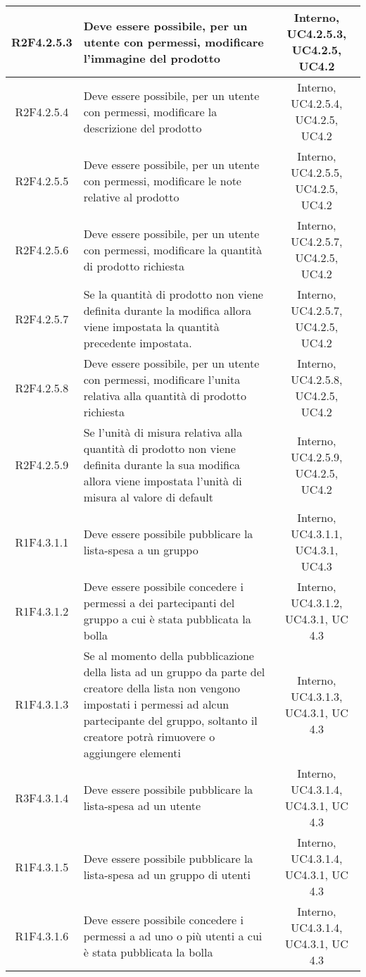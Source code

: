 \begin{longtable}{|c|>{\centering}m{7cm}|c|}
			\hline
			R2F4.2.5.3 & Deve essere possibile, per un utente con permessi, modificare l'immagine del prodotto & Interno, UC4.2.5.3, UC4.2.5, UC4.2 \\
			\hline
			R2F4.2.5.4 & Deve essere possibile, per un utente con permessi, modificare la descrizione del prodotto & Interno, UC4.2.5.4, UC4.2.5, UC4.2 \\
			\hline
			R2F4.2.5.5 & Deve essere possibile, per un utente con permessi, modificare le note relative al prodotto & Interno, UC4.2.5.5, UC4.2.5, UC4.2 \\
			\hline
			R2F4.2.5.6 & Deve essere possibile, per un utente con permessi, modificare la quantità di prodotto richiesta & Interno, UC4.2.5.7, UC4.2.5, UC4.2 \\
			\hline
			R2F4.2.5.7 & Se la quantità di prodotto non viene definita durante la modifica allora viene impostata la quantità precedente impostata. & Interno, UC4.2.5.7, UC4.2.5, UC4.2 \\
			\hline
			R2F4.2.5.8 & Deve essere possibile, per un utente con permessi, modificare l'unita relativa alla quantità di prodotto richiesta & Interno, UC4.2.5.8, UC4.2.5, UC4.2 \\
			\hline
			R2F4.2.5.9 & Se l'unità di misura relativa alla quantità di prodotto non viene definita durante la sua modifica allora viene impostata l'unità di misura al valore di default & Interno, UC4.2.5.9, UC4.2.5, UC4.2 \\
			\hline
			R1F4.3.1.1 & Deve essere possibile pubblicare la lista-spesa a un gruppo & Interno, UC4.3.1.1, UC4.3.1, UC4.3 \\
			\hline
			R1F4.3.1.2 & Deve essere possibile concedere i permessi a dei partecipanti del gruppo a cui è stata pubblicata la bolla & Interno, UC4.3.1.2, UC4.3.1, UC 4.3 \\
			\hline
			R1F4.3.1.3 & Se al momento della pubblicazione della lista ad un gruppo da parte del creatore della lista non vengono impostati i permessi ad alcun partecipante del gruppo, soltanto il creatore potrà rimuovere o aggiungere elementi & Interno, UC4.3.1.3, UC4.3.1, UC 4.3 \\
			\hline
			R3F4.3.1.4 & Deve essere possibile pubblicare la lista-spesa ad un utente & Interno, UC4.3.1.4, UC4.3.1, UC 4.3 \\
			\hline
			R1F4.3.1.5 & Deve essere possibile pubblicare la lista-spesa ad un gruppo di utenti & Interno, UC4.3.1.4, UC4.3.1, UC 4.3 \\
			\hline
			R1F4.3.1.6 & Deve essere possibile concedere i permessi a ad uno o più utenti a cui è stata pubblicata la bolla & Interno, UC4.3.1.4, UC4.3.1, UC 4.3 \\

\end{longtable}
